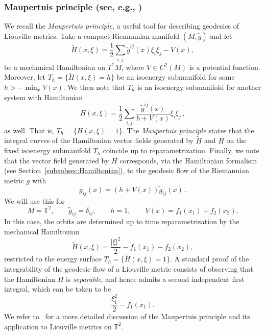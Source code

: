 \documentclass[11pt,letterpaper,oneside]{amsart}
\newcommand{\T}{\mathbb{T}}
\theoremstyle{definition}
\theoremstyle{remark}
\theoremstyle{definition}
\theoremstyle{remark}
\begin{document}
\subsubsection{Maupertuis principle (see, e.g., \cite{bolsinov1995maupertuis})} \label{subsubsec:Maupertuis}  
We recall the \textit{Maupertuis principle}, a useful tool for describing geodesics of Liouville metrics. Take a compact Riemannian manifold $(M,\widetilde g)$ and let 
\begin{equation} \label{eq:natHamilton}
\widetilde{H}(x,\xi) = \frac{1}{2}\sum_{i,j} \widetilde{g}^{ij}(x)\xi_i\xi_j - V(x),
\end{equation}
be a mechanical Hamiltonian on $T^*M$, where $V \in C^2(M)$ is a potential function. Moreover, let $T_h = \{\widetilde{H}(x,\xi) = h\}$ be an isoenergy submanifold for some $h > -\min_x V(x)$. We then note that $T_h$ is an isoenergy submanifold for another system with Hamiltonian 
\begin{equation} \label{eq:H-1}
H(x,\xi) = \frac{1}{2}\sum_{i,j} \frac{\widetilde g^{ij}(x)}{h+V(x)}\xi_i\xi_j\,,
\end{equation}
as well. That is, $T_h = \{H(x,\xi) = 1\}$. The \emph{Maupertuis principle} states that the integral curves of the Hamiltonian vector fields generated by $\widetilde{H}$ and $H$ on the fixed isoenergy submanifold $T_h$ coincide up to reparametrization. 
Finally, we note that the vector field generated by $H$ corresponds, via the Hamiltonian formalism (see Section~\ref{subsubsec:Hamiltonian}), to the geodesic flow of the Riemannian metric $g$ with
\begin{equation*}
    g_{ij}(x) = (h+V(x))\widetilde{g}_{ij}(x)\,. 
\end{equation*} 
We will use this for
\begin{equation} \label{eq:Maupertuis}
M=\T^2,\qquad \widetilde{g}_{ij}=\delta_{ij},\qquad h=1,\qquad V(x)=f_1(x_1)+f_2(x_2).
\end{equation}
In this case, the orbits are determined up to time reparametrization by the mechanical Hamiltonian 
\begin{equation}\label{eq:H separable}
    \widetilde H(x, \xi) = \frac{|\xi|^2}{2} - f_1(x_1) - f_2(x_2),
\end{equation}
restricted to the energy surface $T_h = \{ \widetilde{H}(x,\xi) = 1\}$.
A standard proof of the integrability of the geodesic flow of a Liouville metric consists of observing that the Hamiltonian $\widetilde H$ is \emph{separable}, and hence admits a second independent first integral, which can be taken to be 
\begin{equation*}
    \frac{\xi_1^2}{2} - f_1(x_1).
\end{equation*}
We refer to~\cite{henheik2025deformational} for a more detailed discussion of the Maupertuis principle and its application to Liouville metrics on $\T^2$.
\end{document}
